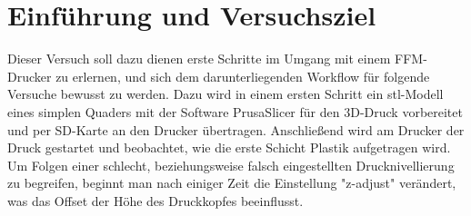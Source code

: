 \documentclass[a4paper,12pt,bibtotocnumbered]{scrartcl}
\numberwithin{equation}{section} %
\begin{document}
\thispagestyle{empty}
\tableofcontents 
\clearpage %


\renewcommand{\thepage}{\arabic{page}}
\setcounter{page}{1}



\listoffigures
{}

\listoftables
{}

\newpage
\onehalfspacing 

\section[Einführung]{Einführung und Versuchsziel}

Dieser Versuch soll dazu dienen erste Schritte im Umgang mit einem FFM-Drucker zu erlernen, und sich dem darunterliegenden Workflow für folgende Versuche bewusst zu werden. Dazu wird in einem ersten Schritt ein stl-Modell eines simplen Quaders mit der Software PrusaSlicer für den 3D-Druck vorbereitet und per SD-Karte an den Drucker übertragen. Anschließend wird am Drucker der Druck gestartet und beobachtet, wie die erste Schicht Plastik aufgetragen wird. Um Folgen einer schlecht, beziehungsweise falsch eingestellten Drucknivellierung zu begreifen, beginnt man nach einiger Zeit die Einstellung "z-adjust" verändert, was das Offset der Höhe des Druckkopfes beeinflusst. 
\end{document}
